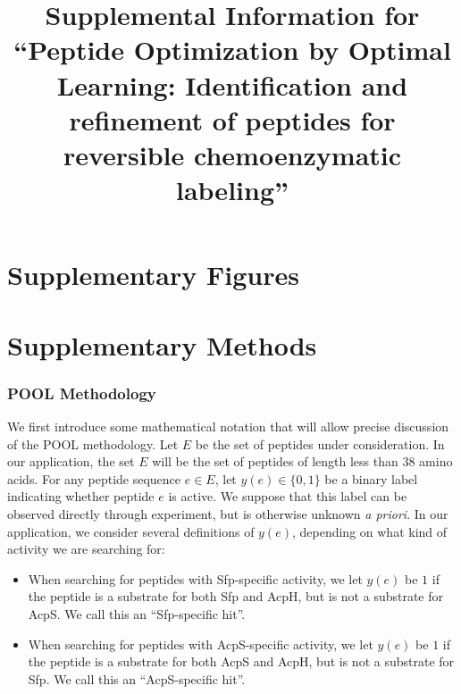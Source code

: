 \documentclass[11pt]{article}
\begin{document}
\title{Supplemental Information for \enquote{Peptide Optimization by Optimal Learning: 
Identification and refinement of peptides for reversible chemoenzymatic labeling}}
\maketitle
\tableofcontents
\newpage
\part{Supplementary Figures}
\part{Supplementary Methods}
\section{POOL Methodology}



We first introduce some mathematical notation that will allow precise discussion of the POOL methodology. Let $E$ be the set of peptides under consideration.
In our application, the set $E$ will be the set of peptides of length less than 38 amino acids.
For any peptide sequence $e \in E$, let $y(e) \in \{0, 1\}$ be a binary label indicating whether
peptide $e$ is active.  We suppose that this label can be observed directly through experiment, but is otherwise unknown {\it a priori}.
In our application, we consider several definitions of $y(e)$, depending on what kind of activity we are searching for:
\begin{itemize}
\item When searching for peptides with Sfp-specific activity, we let $y(e)$ be $1$ if the peptide is a substrate for both Sfp and AcpH, but is not a substrate for AcpS.  We call this an \enquote{Sfp-specific hit}.
\item When searching for peptides with AcpS-specific activity, we let $y(e)$ be $1$ if the peptide is a substrate for both AcpS and AcpH, but is not a substrate for Sfp.  We call this an \enquote{AcpS-specific hit}.
\end{itemize}
\end{document}
